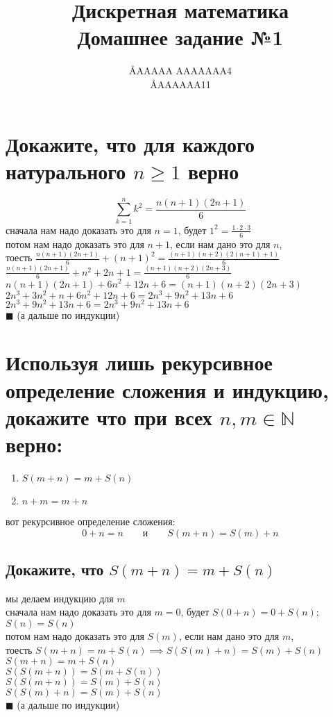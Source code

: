 \documentclass{article}
\title{Дискретная математика \\ Домашнее задание №1}
\author{\AA{AAAAA AAAAAAA}{4} \\ \AA{AAAAAA}{11}}
\newcommand{\ds}{\displaystyle}
\begin{document}
  \maketitle

  \section{Докажите, что для каждого натурального $n \geq 1$ верно}
  $$\sum_{k=1}^n k^2 = \frac{n(n+1)(2n+1)}{6}$$
  сначала нам надо доказать это для $n=1$, будет $\ds 1^2 = \frac{1 \cdot 2 \cdot 3}{6}$ \\
  потом нам надо доказать это для $n+1$, если нам дано это для $n$, \\
  тоесть $\ds \frac{n(n+1)(2n+1)}{6} + (n+1)^2 = \frac{(n+1)(n+2)(2(n+1)+1)}{6}$ \\
  $\ds \frac{n(n+1)(2n+1)}{6} + n^2 + 2n + 1 = \frac{(n+1)(n+2)(2n+3)}{6}$ \\
  $\ds n(n+1)(2n+1) + 6n^2 + 12n + 6 = (n+1)(n+2)(2n+3)$ \\
  $\ds 2n^3 + 3n^2 + n + 6n^2 + 12n + 6 = 2n^3 + 9n^2 + 13n + 6$ \\
  $\ds 2n^3 + 9n^2 + 13n + 6 = 2n^3 + 9n^2 + 13n + 6$ \\
  $\blacksquare$ (а дальше по индукции)

  \section{Используя лишь рекурсивное определение сложения и индукцию, докажите что при всех $n, m \in \mathbb{N}$ верно:}
  \begin{center}
    \begin{varwidth}{\textwidth}
      \begin{enumerate}
        \item $S(m+n) = m+S(n)$
        \item $n+m = m+n$
      \end{enumerate}
    \end{varwidth}
  \end{center}
  вот рекурсивное определение сложения:
  $$ 0+n=n \qquad \textrm{и} \qquad S(m+n) = S(m)+n $$
  \subsection{Докажите, что $S(m+n) = m+S(n)$}
  \label{recsymetry}
  мы делаем индукцию для $m$ \\
  сначала нам надо доказать это для $m=0$, будет $ S(0+n) = 0+S(n) $; $S(n)=S(n)$ \\
  потом нам надо доказать это для $S(m)$, если нам дано это для $m$, \\
  тоесть $ S(m+n) = m+S(n) \implies S(S(m)+n) = S(m)+S(n) $ \\
  $ S(m+n) = m+S(n) $ \\
  $ S(S(m+n)) = S(m+S(n)) $ \\
  $ S(S(m+n)) = S(m)+S(n) $ \\
  $ S(S(m)+n) = S(m)+S(n) $ \\
  $\blacksquare$ (а дальше по индукции)
\end{document}
